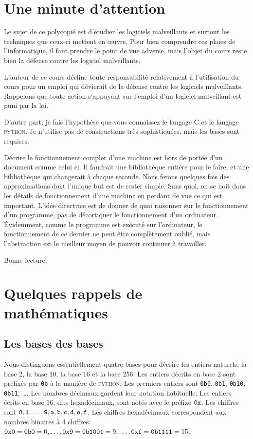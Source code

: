 \documentclass{book}
\newcommand{\python}{\textsc{python}\xspace}
\newcommand{\C}{\textsc{C}\xspace}
\newcommand{\hexa}[1]{{\tt 0x#1}}
\newcommand{\bina}[1]{{\tt 0b#1}}
\begin{document}
	
\chapter{Une minute d'attention}

Le sujet de ce polycopié est d'étudier les logiciels malveillants et surtout les techniques que ceux-ci mettent en \oe uvre. Pour bien comprendre ces plaies de l'informatique, il faut prendre le point de vue adverse, mais l'objet du cours reste bien la défense contre les logiciel malveillants. 

L'auteur de ce cours décline toute responsabilité relativement à l'utilisation du cours pour un emploi qui dévierait de la défense contre les logiciels malveillants. Rappelons que toute action s'appuyant sur l'emploi d'un logiciel malveillant est puni par la loi. 

D'autre part, je fais l'hypothèse que vous connaissez le langage \C et le langage \python. Je n'utilise pas de constructions très sophistiquées, mais les bases sont requises.

Décrire le fonctionnement complet d'une machine est hors de portée d'un document comme celui ci. Il faudrait une bibliothèque entière pour le faire, et une bibliothèque qui changerait à chaque seconde. Nous ferons  quelques fois des approximations dont l'unique but est de rester simple. Sans quoi, on se noit dans les détails de fonctionnement d'une machine en perdant de vue ce qui est important. L'idée directrice est de donner de quoi raisonner sur le fonctionnement d'un programme, pas de décortiquer le fonctionnement d'un ordinateur. \'Evidemment, comme le programme est exécuté sur l'ordinateur, le fonctionnement de ce dernier ne peut être complètement oublié, mais l'abstraction est le meilleur moyen de pouvoir continuer à travailler.

\medskip
Bonne lecture,

\chapter{Quelques rappels de mathématiques}

\section{Les bases des bases}

Nous distinguons essentiellement quatre bases pour décrire les entiers naturels, la base $2$, la base $10$, la base $16$ et la base $256$. Les entiers décrits en base $2$ sont préfixés par {\tt 0b} à la manière de \python. Les premiers entiers sont {\bina{0}, \bina{1}, \bina{10}, \bina{11}, \ldots}.  Les nombres décimaux gardent leur notation habituelle.  Les entiers écrits en base 16, dits hexadécimaux, sont notés avec le préfixe $\tt 0x$. Les chiffres sont $\tt 0, 1, \ldots, 9, a, b, c, d, e, f$. Les chiffres hexadécimaux correspondent aux nombres binaires à 4 chiffres: $\hexa{0} = \bina{0} = 0, \ldots, \hexa{9} = \bina{1001} = 9, \ldots, \hexa{f} = \bina{1111} = 15$. 
\end{document}

